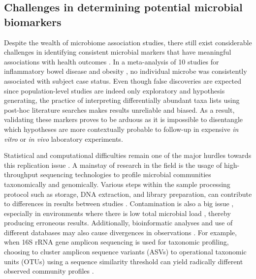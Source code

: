 \subsection{Challenges in determining potential microbial biomarkers}
Despite the wealth of microbiome association studies, there still exist considerable challenges in identifying consistent microbial markers that have meaningful associations with health outcomes \cite{duvallet2017metaanalysis}. In a meta-analysis of 10 studies for inflammatory bowel disease and obesity \cite{walters2014metaanalyses}, no individual microbe was consistently associated with subject case status. Even though false discoveries are expected since population-level studies are indeed only exploratory and hypothesis generating, the practice of interpreting differentially abundant taxa lists using post-hoc literature searches makes results unreliable and biased. As a result, validating these markers proves to be arduous as it is impossible to disentangle which hypotheses are more contextually probable to follow-up in expensive \emph{in vitro} or \emph{in vivo} laboratory experiments.  

Statistical and computational difficulties remain one of the major hurdles towards this replication issue \cite{li2015microbiome, li2019comparative}. A mainstay of research in the field is the usage of high-throughput sequencing technologies to profile microbial communities taxonomically and genomically. Various steps within the sample processing protocol such as storage, DNA extraction, and library preparation, can contribute to differences in results between studies \cite{clausen2021evaluating}. Contamination is also a big issue \cite{davis2018simple}, especially in environments where there is low total microbial load \cite{eisenhofer2019contamination}, thereby producing erroneous results. Additionally, bioinformatic analyses and use of different databases may also cause divergences in observations \cite{moossavi2020biological}. For example, when 16S rRNA gene amplicon sequencing is used for taxonomic profiling, choosing to cluster amplicon sequence variants (ASVs) to operational taxonomic units (OTUs) using a sequence similarity threshold can yield radically different observed community profiles \cite{chiarello2022ranking, moossavi2020biological}.   

